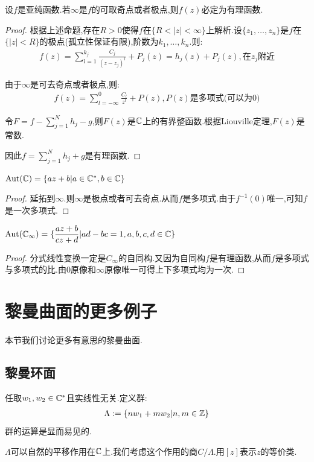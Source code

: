 \begin{theorem}
	设$f$是亚纯函数.若$\infty$是$f$的可取奇点或者极点,则$f(z)$必定为有理函数.
\end{theorem}
\begin{proof}
	根据上述命题,存在$R>0$使得$f$在$\{R<|z|<\infty\}$上解析.设$\{z_1,\dots,z_n\}$是$f$在$\{|z|<R\}$的极点(孤立性保证有限),阶数为$k_1,\dots,k_n$.则:
	\begin{align*}
		f(z)=\sum_{l=1}^{k_j} \frac{C_j}{(z-z_j)^l}+P_j(z)=h_j(z)+P_j(z),\text{在}z_j\text{附近}
	\end{align*}
    
	由于$\infty$是可去奇点或者极点,则:
	\begin{align*}
		f(z)=\sum_{l=-\infty}^0 \frac{C_l}{z^{l}}+P(z),P(z)\text{是多项式(可以为}0)
	\end{align*}

	令$F=f-\sum_{j=1}^N h_j-g$,则$F(z)$是$\mathbb{C}$上的有界整函数.根据Liouville定理,$F(z)$是常数.

	因此$f=\sum_{j=1}^Nh_j+g$是有理函数.
\end{proof}
\begin{corollary}
	$\mathrm{Aut}(\mathbb{C})=\{az+b|a \in \mathbb{C}^*,b\in \mathbb{C}\}$
\end{corollary}
\begin{proof}
	延拓到$\infty$.则$\infty$是极点或者可去奇点.从而$f$是多项式.由于$f^{-1}(0)$唯一,可知$f$是一次多项式.
\end{proof}
\begin{corollary}
	$\mathrm{Aut}(\mathbb{C}_\infty)=\{\dfrac{az+b}{cz+d}|ad-bc=1,a,b,c,d\in \mathbb{C}\}$
\end{corollary}
\begin{proof}
	分式线性变换一定是$C_\infty$的自同构.又因为自同构$f$是有理函数,从而$f$是多项式与多项式的比.由$0$原像和$\infty$原像唯一可得上下多项式均为一次.
\end{proof}
\section{黎曼曲面的更多例子}
本节我们讨论更多有意思的黎曼曲面.
\subsection*{黎曼环面}
\begin{definition}
	任取$w_1,w_2 \in \mathbb{C}^*$且实线性无关.定义群:
	\begin{align*}
		\Lambda:=\{nw_1+mw_2|n,m \in \mathbb{Z}\}
	\end{align*}
	群的运算是显而易见的.
\end{definition}
$\Lambda$可以自然的平移作用在$\mathbb{C}$上.我们考虑这个作用的商$C/\Lambda$.用$[z]$表示$z$的等价类.

